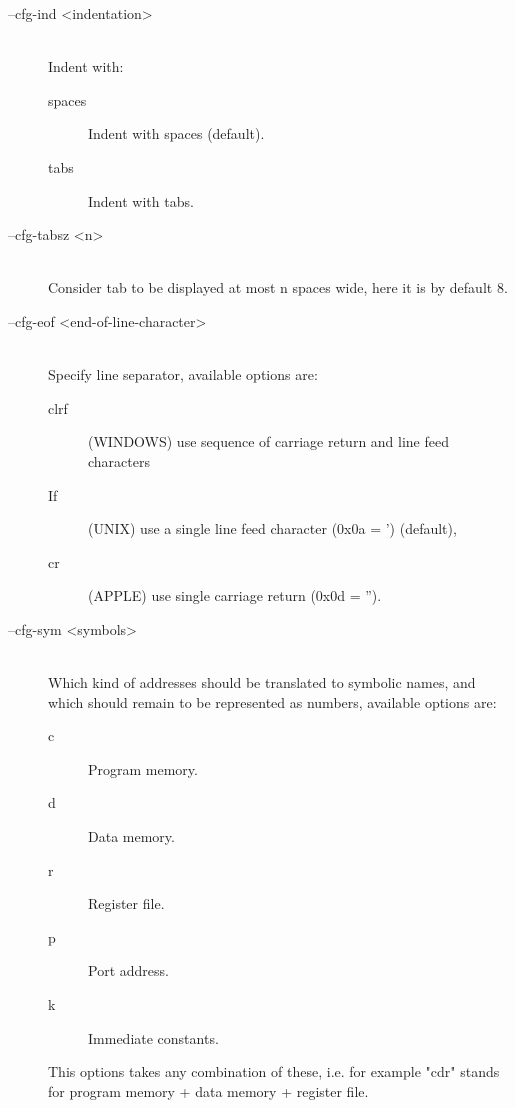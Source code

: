 \begin{description}
            \item[--cfg-ind <indentation>]~\\
                Indent with:
                \begin{description}
                    \item [spaces] Indent with spaces (default).
                    \item [tabs] Indent with tabs.
                \end{description}

            \item[--cfg-tabsz <n>]~\\
                Consider tab to be displayed at most n spaces wide, here it is by default 8.

            \item[--cfg-eof <end-of-line-character>]~\\
                Specify line separator, available options are:
                \begin{description}
                    \item [clrf] (WINDOWS) use sequence of carriage return and line feed characters
                    \item [If] (UNIX) use a single line feed character (0x0a = ') (default),
                    \item [cr] (APPLE) use single carriage return (0x0d = '').
                \end{description}

            \item[--cfg-sym <symbols>]~\\
                Which kind of addresses should be translated to symbolic names, and which should remain to be represented as numbers, available options are:
                \begin{description}
                    \item [c] Program memory.
                    \item [d] Data memory.
                    \item [r] Register file.
                    \item [p] Port address.
                    \item [k] Immediate constants.
                \end{description}
                This options takes any combination of these, i.e. for example "cdr" stands for program memory + data memory + register file.


\end{description}
